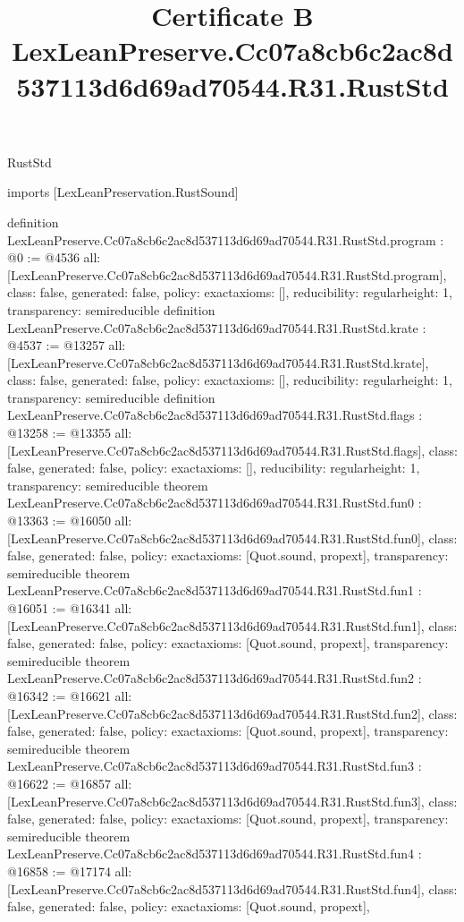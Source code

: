 \begin{lexlean}{RustStd}
\title{Certificate B LexLeanPreserve.Cc07a8cb6c2ac8d537113d6d69ad70544.R31.RustStd}
\begin{coremodule}
imports [LexLeanPreservation.RustSound]

definition LexLeanPreserve.Cc07a8cb6c2ac8d537113d6d69ad70544.R31.RustStd.program : @0 := @4536 {
  all: [LexLeanPreserve.Cc07a8cb6c2ac8d537113d6d69ad70544.R31.RustStd.program],
  class: false,
  generated: false,
  policy: exact{axioms: []},
  reducibility: regular{height: 1},
  transparency: semireducible
}
definition LexLeanPreserve.Cc07a8cb6c2ac8d537113d6d69ad70544.R31.RustStd.krate : @4537 := @13257 {
  all: [LexLeanPreserve.Cc07a8cb6c2ac8d537113d6d69ad70544.R31.RustStd.krate],
  class: false,
  generated: false,
  policy: exact{axioms: []},
  reducibility: regular{height: 1},
  transparency: semireducible
}
definition LexLeanPreserve.Cc07a8cb6c2ac8d537113d6d69ad70544.R31.RustStd.flags : @13258 := @13355 {
  all: [LexLeanPreserve.Cc07a8cb6c2ac8d537113d6d69ad70544.R31.RustStd.flags],
  class: false,
  generated: false,
  policy: exact{axioms: []},
  reducibility: regular{height: 1},
  transparency: semireducible
}
theorem LexLeanPreserve.Cc07a8cb6c2ac8d537113d6d69ad70544.R31.RustStd.fun0 : @13363 := @16050 {
  all: [LexLeanPreserve.Cc07a8cb6c2ac8d537113d6d69ad70544.R31.RustStd.fun0],
  class: false,
  generated: false,
  policy: exact{axioms: [Quot.sound, propext]},
  transparency: semireducible
}
theorem LexLeanPreserve.Cc07a8cb6c2ac8d537113d6d69ad70544.R31.RustStd.fun1 : @16051 := @16341 {
  all: [LexLeanPreserve.Cc07a8cb6c2ac8d537113d6d69ad70544.R31.RustStd.fun1],
  class: false,
  generated: false,
  policy: exact{axioms: [Quot.sound, propext]},
  transparency: semireducible
}
theorem LexLeanPreserve.Cc07a8cb6c2ac8d537113d6d69ad70544.R31.RustStd.fun2 : @16342 := @16621 {
  all: [LexLeanPreserve.Cc07a8cb6c2ac8d537113d6d69ad70544.R31.RustStd.fun2],
  class: false,
  generated: false,
  policy: exact{axioms: [Quot.sound, propext]},
  transparency: semireducible
}
theorem LexLeanPreserve.Cc07a8cb6c2ac8d537113d6d69ad70544.R31.RustStd.fun3 : @16622 := @16857 {
  all: [LexLeanPreserve.Cc07a8cb6c2ac8d537113d6d69ad70544.R31.RustStd.fun3],
  class: false,
  generated: false,
  policy: exact{axioms: [Quot.sound, propext]},
  transparency: semireducible
}
theorem LexLeanPreserve.Cc07a8cb6c2ac8d537113d6d69ad70544.R31.RustStd.fun4 : @16858 := @17174 {
  all: [LexLeanPreserve.Cc07a8cb6c2ac8d537113d6d69ad70544.R31.RustStd.fun4],
  class: false,
  generated: false,
  policy: exact{axioms: [Quot.sound, propext]},
}
\end{coremodule}
\end{lexlean}
